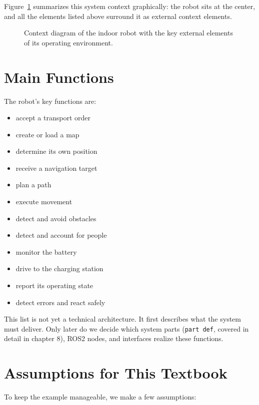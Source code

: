 Figure~\ref{fig:kap05-kontextdiagramm} summarizes this system context graphically: the robot sits at the center, and all the elements listed above surround it as external context elements.

\begin{figure}[H]
  \centering
  \caption{Context diagram of the indoor robot with the key external elements of its operating environment.}
  \label{fig:kap05-kontextdiagramm}
\end{figure}

\section{Main Functions}
The robot's key functions are:

\begin{itemize}
    \item accept a transport order
    \item create or load a map
    \item determine its own position
    \item receive a navigation target
    \item plan a path
    \item execute movement
    \item detect and avoid obstacles
    \item detect and account for people
    \item monitor the battery
    \item drive to the charging station
    \item report its operating state
    \item detect errors and react safely
\end{itemize}

This list is not yet a technical architecture. It first describes what the system must deliver. Only later do we decide which system parts (\texttt{part def}, covered in detail in chapter 8), ROS2 nodes, and interfaces realize these functions.

\section{Assumptions for This Textbook}
To keep the example manageable, we make a few assumptions:


